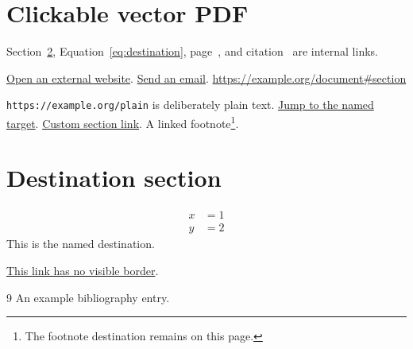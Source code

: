 \documentclass{article}
\begin{document}
\section{Clickable vector PDF}
Section~\ref{sec:destination}, Equation~\eqref{eq:destination},
page~\pageref{sec:destination}, and citation~\cite{example} are internal links.

\href{https://example.org/a?x=1\&y=2%20ok#fragment}{Open an external website}.
\href{mailto:author@example.org}{Send an email}.
\url{https://example.org/document#section}

\nolinkurl{https://example.org/plain} is deliberately plain text.
\hyperlink{named-target}{Jump to the named target}.
\hyperref[sec:destination]{Custom section link}.
A linked footnote\footnote{The footnote destination remains on this page.}.

\newpage
\section{Destination section}\label{sec:destination}
\begin{align}
x&=1\label{eq:first}\\
y&=2\label{eq:destination}
\end{align}
\hypertarget{named-target}{This is the named destination.}

\hypersetup{hidelinks}
\href{https://example.org/invisible}{This link has no visible border}.
\newpage
\begin{thebibliography}{9}
 An example bibliography entry.
\end{thebibliography}
\end{document}
